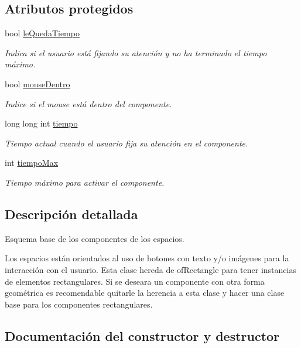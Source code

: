 \subsection*{Atributos protegidos}
\begin{DoxyCompactItemize}
\item 
bool \hyperlink{classcomponente_base_ab03e8ff7fb596e34738ba00d455e37f5}{le\+Queda\+Tiempo}
\begin{DoxyCompactList}\small\item\em Indica si el usuario está fijando su atención y no ha terminado el tiempo máximo. \end{DoxyCompactList}\item 
bool \hyperlink{classcomponente_base_a3cd688b2120c9545e25b490911e66717}{mouse\+Dentro}
\begin{DoxyCompactList}\small\item\em Indice si el mouse está dentro del componente. \end{DoxyCompactList}\item 
long long int \hyperlink{classcomponente_base_a6c1aa628629954f831209628e3dfcb2b}{tiempo}
\begin{DoxyCompactList}\small\item\em Tiempo actual cuando el usuario fija su atención en el componente. \end{DoxyCompactList}\item 
int \hyperlink{classcomponente_base_a0edb9230fa502947fd80006463f9ce25}{tiempo\+Max}
\begin{DoxyCompactList}\small\item\em Tiempo máximo para activar el componente. \end{DoxyCompactList}\end{DoxyCompactItemize}


\subsection{Descripción detallada}
Esquema base de los componentes de los espacios. 

Los espacios están orientados al uso de botones con texto y/o imágenes para la interacción con el usuario. Esta clase hereda de of\+Rectangle para tener instancias de elementos rectangulares. Si se deseara un componente con otra forma geométrica es recomendable quitarle la herencia a esta clase y hacer una clase base para los componentes rectangulares. 

\subsection{Documentación del constructor y destructor}
\hypertarget{classcomponente_base_a98286225e2be6f2080fe7d409e077a96}{}
